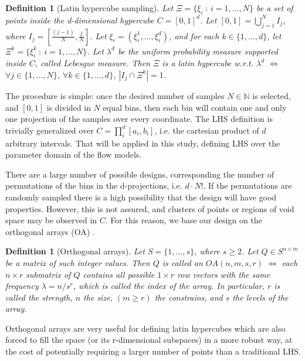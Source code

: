 \documentclass{article}
\newtheorem{definition}[theorem]{Definition}
\begin{document}
\begin{definition}[Latin hypercube sampling]
Let $\Xi=\{\xi_i\ :\ i=1,\dots,N\}$ be a set of points inside the d-dimensional hypercube $C=[0,1]^d$. Let $[0,1]=\bigcup_{j=1}^{N} I_j$, where $I_j=[\frac{(j-1)}{N},\frac{j}{N}]$. Let $\xi_i=\left(\xi_i^1,\dots,\xi_i^d\right)$, and for each $k\in\{1,\dots,d\}$, let $\Xi^k=\{\xi^k_i\ :\ i=1,\dots,N\}$. Let $\lambda^d$ be the uniform probability measure supported inside $C$, called Lebesgue measure. Then $\Xi$ is a latin hypercube w.r.t. $\lambda^d$ $\Longleftrightarrow$ $\forall j\in \{1,\dots,N\}$, $\forall k\in\{1,\dots,d\}$, $\left|I_j\cap\Xi^k\right|=1$.
\end{definition}

The procedure is simple: once the desired number of samples $N\in\mathbb N$ is selected, and $[0,1]$ is divided in $N$ equal bins, then each bin will contain one and only one projection of the samples over every coordinate. The LHS definition is trivially generalized over $C=\prod^d_i [a_i, b_i]$, i.e. the cartesian product of $d$ arbitrary intervals. That will be applied in this study, defining LHS over the parameter domain of the flow models.

There are a large number of possible designs, corresponding the number of permutations of the bins in the d-projections, i.e. $d\cdot N!$. If the permutations are randomly sampled there is a high possibility that the design will have good properties. However, this is not assured, and clusters of points or regions of void space may be observed in $C$. For this reason, we base our design on the orthogonal arrays (OA) \citep{Owen1992a,Tang1993}.

\begin{definition}[Orthogonal arrays]
Let $S=\{1,\dots,s\}$, where $s\ge 2$. Let $Q\in S^{n\times m}$ be a matrix of such integer values. Then $Q$ is called an $OA(n,m,s,r)$ $\Longleftrightarrow$ each $n\times r$ submatrix of $Q$ contains all possible $1\times r$ row vectors with the same frequency $\lambda=n/s^r$, which is called the index of the array. In particular, $r$ is called the strength, $n$ the size, $(m\ge r)$ the constrains, and $s$ the levels of the array.
\end{definition}

Orthogonal arrays are very useful for defining latin hypercubes which are also forced to fill the space (or its r-dimensional subspaces) in a more robust way, at the cost of potentially requiring a larger number of points than a traditional LHS.
\end{document}
